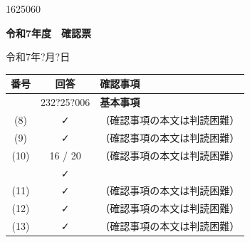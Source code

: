 \documentclass[UTF8,10pt,a4paper,fontset=fandol]{ctexart}
\newcommand{\fieldvalue}[1]{#1}
\newcommand{\handwritten}[1]{#1}
\begin{document}
\fieldvalue{\handwritten{1625060}}


\newpage

\begin{flushright}
\textbf{令和7年度　確認票}
\end{flushright}

\begin{flushright}
\fieldvalue{\handwritten{令和7年?月?日}}
\end{flushright}

\begin{tabularx}{\textwidth}{|c|c|X|}
\hline
\textbf{番号} & \textbf{回答} & \textbf{確認事項} \\
\hline
 & 
\fieldvalue{\handwritten{232?25?006}}
&
\textbf{基本事項} \\
\hline
(8) &
\fieldvalue{\handwritten{✓}}
&
（確認事項の本文は判読困難） \\
\hline
(9) &
\fieldvalue{\handwritten{✓}}
&
（確認事項の本文は判読困難） \\
\hline
(10) &
\fieldvalue{\handwritten{16 / 20}}
&
（確認事項の本文は判読困難）
\\[-1mm]
&
\fieldvalue{\handwritten{✓}}
&
\\
\hline
(11) &
\fieldvalue{\handwritten{✓}}
&
（確認事項の本文は判読困難） \\
\hline
(12) &
\fieldvalue{\handwritten{✓}}
&
（確認事項の本文は判読困難） \\
\hline
(13) &
\fieldvalue{\handwritten{✓}}
&
（確認事項の本文は判読困難） \\

\end{tabularx}
\end{document}
